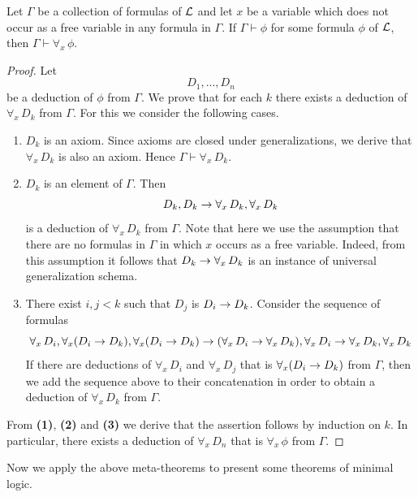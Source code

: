 \documentclass[10pt]{amsart}
\begin{document}
\begin{theorem}\label{theorem:variable_generalization_rule}
	Let $\Gamma$ be a collection of formulas of ${\mathcal L}$ and let $x$ be a variable which does not occur as a free variable in any formula in $\Gamma$. If $\Gamma \vdash \phi$ for some formula $\phi$ of ${\mathcal L}$, then $\Gamma \vdash \forall_x\,\phi$.
\end{theorem}
\begin{proof}
	Let
	$$D_1,...,D_n$$
	be a deduction of $\phi$ from $\Gamma$. We prove that for each $k$ there exists a deduction of $\forall_x\,D_k$ from $\Gamma$. For this we consider the following cases.
	\begin{enumerate}[label=\textbf{(\arabic*)}, leftmargin=3.0em]
		\item $D_k$ is an axiom. Since axioms are closed under generalizations, we derive that $\forall_x\,D_k$ is also an axiom. Hence $\Gamma \vdash \forall_x\,D_k$.
		\item $D_k$ is an element of $\Gamma$. Then
		      $$D_k,D_k \rightarrow \forall_x\,D_k,\forall_x\,D_k$$
		      is a deduction of $\forall_x\,D_k$ from $\Gamma$. Note that here we use the assumption that there are no formulas in $\Gamma$ in which $x$ occurs as a free variable. Indeed, from this assumption it follows that $D_k \rightarrow \forall_x\,D_k$ is an instance of universal generalization schema.
		\item There exist $i, j < k$ such that $D_j$ is $D_i \rightarrow D_k$. Consider the sequence of formulas
		      $$\forall_x\,D_i , \forall_x(D_i \rightarrow D_k ) , \forall_x (D_i \rightarrow D_k ) \rightarrow (\forall_x\,D_i \rightarrow \forall_x\,D_k) , \forall_x\,D_i \rightarrow \forall_x\,D_k , \forall_x\,D_k$$
		      If there are deductions of $\forall_x\,D_i$ and $\forall_x\,D_j$ that is $\forall_x(D_i \rightarrow D_k)$ from $\Gamma$, then we add the sequence above to their concatenation in order to obtain a deduction of $\forall_x\,D_k$ from $\Gamma$.
	\end{enumerate}
	From \textbf{(1)}, \textbf{(2)} and \textbf{(3)} we derive that the assertion follows by induction on $k$. In particular, there exists a deduction of $\forall_x\,D_n$ that is $\forall_x\,\phi$ from $\Gamma$.
\end{proof}
\noindent
Now we apply the above meta-theorems to present some theorems of minimal logic.
\end{document}
